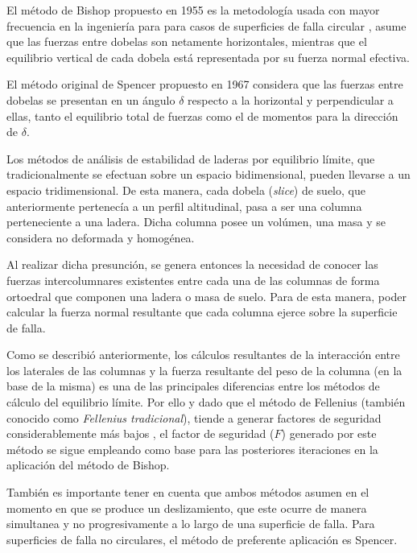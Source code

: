 El m\'etodo de Bishop propuesto en 1955 es la metodolog\'ia usada con mayor frecuencia en la ingenier\'ia para para casos de superficies de falla circular \cite{huangB}, asume que las fuerzas entre dobelas son netamente horizontales, mientras que el equilibrio vertical de cada dobela est\'a representada por su fuerza normal efectiva.

El m\'etodo original de Spencer propuesto en 1967 \cite{spencer1967method} considera que las fuerzas entre dobelas se presentan en un \'angulo $\delta$ respecto a la horizontal y perpendicular a ellas, tanto el equilibrio total de fuerzas como el de momentos para la direcci\'on de $\delta$. 

Los m\'etodos de an\'alisis de estabilidad de laderas por equilibrio l\'imite, que tradicionalmente se efectuan sobre un espacio bidimensional, pueden llevarse a un espacio tridimensional. 
De esta manera, cada dobela (\textit{slice}) de suelo, que anteriormente pertenec\'ia a un perfil altitudinal, pasa a ser una columna perteneciente a una ladera. Dicha columna posee un vol\'umen, una masa y se considera no deformada y homog\'enea. \cite{huang2000new}

Al realizar dicha presunci\'on, se genera entonces la necesidad de conocer las fuerzas intercolumnares existentes entre cada una de las columnas de forma ortoedral que componen una ladera o masa de suelo. Para de esta manera, poder calcular la fuerza normal resultante que cada columna ejerce sobre la superficie de falla.\cite{reid2015scoops3d}

Como se describi\'o anteriormente, los c\'alculos resultantes de la interacci\'on entre los laterales de las columnas y la fuerza resultante del peso de la columna (en la base de la misma) es una de las principales diferencias entre los m\'etodos de c\'alculo del equilibrio l\'imite. Por ello y dado que el m\'etodo de Fellenius (tambi\'en conocido como  \emph{Fellenius tradicional}), tiende a generar factores de seguridad considerablemente m\'as bajos \cite{traditional}, el factor de seguridad (\(F\)) generado por este m\'etodo se sigue empleando como base para las posteriores iteraciones en la aplicaci\'on del m\'etodo de Bishop. \cite{fredlund1977comparison}

Tambi\'en es importante tener en cuenta que ambos m\'etodos asumen en el momento en que se produce un deslizamiento, que este ocurre de manera simultanea y no progresivamente a lo largo de una superficie de falla.
Para superficies de falla no circulares, el m\'etodo de preferente aplicaci\'on es Spencer.  \cite{huangS} 


